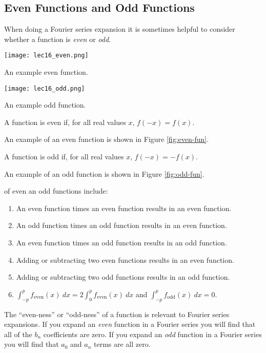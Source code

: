 \subsection{Even Functions and Odd Functions}  
When doing a Fourier series expansion it is sometimes helpful to consider whether a function is \emph{even} or \emph{odd}.  
\begin{marginfigure}
\texttt{[image: lec16\_even.png]}
\caption{An example even function.}
\label{fig:even-fun}
\end{marginfigure}
\begin{marginfigure}
\texttt{[image: lec16\_odd.png]}
\caption{An example odd function.}
\label{fig:odd-fun}
\end{marginfigure}
\begin{definition}
A function is even if, for all real values $x$, $f(-x) = f(x)$.  
\end{definition}
An example of an even function is shown in Figure \ref{fig:even-fun}.
\begin{definition}
A function is odd if, for all real values $x$, $f(-x) = -f(x)$.
\end{definition}
An example of an odd function is shown in Figure \ref{fig:odd-fun}.

 of even an odd functions include:
\begin{enumerate}
\item An even function times an even function results in an even function.
\item An odd function times an odd function results in an even function.
\item An even function times an odd function results in an odd function.
\item Adding or subtracting two even functions results in an even function.
\item Adding or subtracting two odd functions results in an odd function.
\item $\int_{-p}^{p} f_{\text{even}}(x) \ dx = 2\int_{0}^{p} f_{\text{even}}(x) \ dx$ and $\int_{-p}^{p} f_{\text{odd}}(x) \ dx = 0$.
\end{enumerate}

The ``even-ness'' or ``odd-ness'' of a function is relevant to Fourier series expansions.  If you expand an \emph{even} function in a Fourier series you will find that all of the $b_n$ coefficients are zero.  If you expand an \emph{odd} function in a Fourier series you will find that $a_0$ and $a_n$ terms are all zero.


